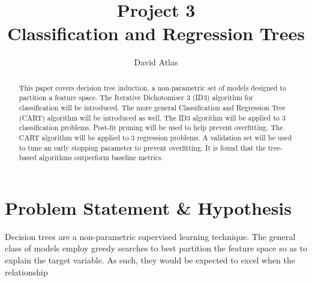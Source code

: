 \documentclass{amsart}
\title{Project 3 \\ Classification and Regression Trees}
\author{David Atlas}
\begin{document}
    \begin{abstract}
    This paper covers decision tree induction, a non-parametric
    set of models designed to partition a feature space. The Iterative Dichotomiser 3 (ID3)
    algorithm for classification will be introduced. The more general
    Classification and Regression Tree (CART) algorithm will be introduced as well.
    The ID3 algorithm will be applied to 3 classification problems.
    Post-fit pruning will be used to help prevent overfitting.
    The CART algorithm will be applied to 3 regression problems.
    A validation set will be used to tune an early stopping parameter to
    prevent overfitting. It is found that the tree-based algorithms
    outperform baseline metrics.
    \end{abstract}

    \section{Problem Statement \& Hypothesis}
    Decision trees are a non-parametric supervised learning technique.
    The general class of models employ greedy searches to best partition
    the feature space so as to explain the target variable. As such, they would
    be expected to excel when the relationship
\end{document}
